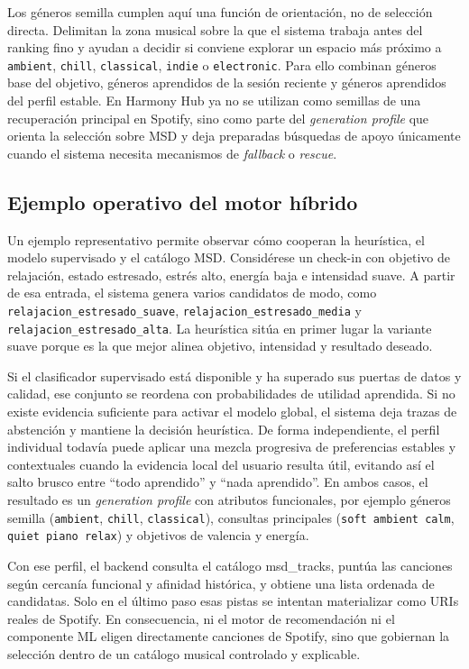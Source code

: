 Los géneros semilla cumplen aquí una función de orientación, no de selección
directa. Delimitan la zona musical sobre la que el sistema trabaja antes del
ranking fino y ayudan a decidir si conviene explorar un espacio más próximo a
\texttt{ambient}, \texttt{chill}, \texttt{classical}, \texttt{indie} o
\texttt{electronic}. Para ello combinan géneros base del objetivo, géneros
aprendidos de la sesión reciente y géneros aprendidos del perfil estable. En
Harmony Hub ya no se utilizan como semillas de una
recuperación principal en Spotify, sino como parte del \textit{generation
profile} que orienta la selección sobre MSD y deja preparadas búsquedas de
apoyo únicamente cuando el sistema necesita mecanismos de \textit{fallback} o
\textit{rescue}.


\subsection{Ejemplo operativo del motor híbrido}

Un ejemplo representativo permite observar cómo cooperan la heurística, el
modelo supervisado y el catálogo MSD. Considérese un check-in con objetivo de
relajación, estado estresado, estrés alto, energía baja e intensidad
suave. A partir de esa entrada, el sistema genera varios candidatos de modo,
como \texttt{relajacion\_estresado\_}\allowbreak\texttt{suave},
\texttt{relajacion\_estresado\_}\allowbreak\texttt{media} y
\texttt{relajacion\_estresado\_}\allowbreak\texttt{alta}. La heurística sitúa
en primer lugar la
variante suave porque es la que mejor alinea objetivo, intensidad y resultado
deseado.

Si el clasificador supervisado está disponible y ha superado sus puertas de
datos y calidad, ese conjunto se reordena con probabilidades de utilidad
aprendida. Si no existe evidencia suficiente para activar el modelo global, el
sistema deja trazas de abstención y mantiene la decisión heurística. De forma
independiente, el perfil individual todavía puede aplicar una mezcla
progresiva de preferencias estables y contextuales cuando la evidencia local
del usuario resulta útil, evitando así el salto brusco entre ``todo
aprendido'' y ``nada aprendido''. En ambos casos, el resultado es un
\textit{generation profile} con atributos funcionales, por ejemplo géneros
semilla (\texttt{ambient}, \texttt{chill}, \texttt{classical}), consultas
principales (\texttt{soft ambient calm}, \texttt{quiet piano relax}) y
objetivos de valencia y energía.

Con ese perfil, el backend consulta el catálogo msd\_tracks, puntúa
las canciones según cercanía funcional y afinidad histórica, y obtiene una
lista ordenada de candidatas. Solo en el último paso esas pistas se intentan
materializar como URIs reales de Spotify. En consecuencia, ni el motor de
recomendación ni el componente ML eligen directamente canciones de Spotify,
sino que gobiernan la selección dentro de un catálogo musical controlado y
explicable.

